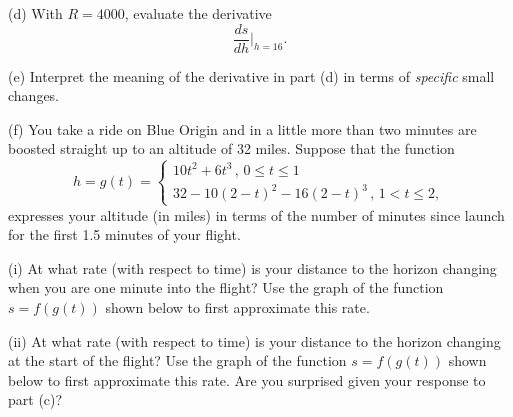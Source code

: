 \documentclass{ximera}
\begin{document}
\begin{question}
(d) With $R=4000$, evaluate the derivative 
\[
      \frac{ds}{dh}\Big|_{h=16} .
\]

(e) Interpret the meaning of the derivative in part (d) in terms of \emph{specific} small changes.

(f) You take a ride on Blue Origin and in a little more than two minutes are boosted straight up to an altitude of 32 miles. Suppose that the function
\[
      h = g(t) = 
\begin{cases}
10t^2 + 6t^3 \, , \, 0\leq t \leq 1  \\
32 - 10(2-t)^2 - 16(2-t)^3 \, , \, 1<t \leq 2 ,
\end{cases}
\]
expresses your altitude (in miles) in terms of the number of minutes since launch for the first 1.5 minutes of your flight.

(i) At what rate (with respect to time) is your distance to the horizon changing when you are one minute into the flight? Use the graph of the function $s=f(g(t))$ shown below to first approximate this rate.

(ii)  At what rate (with respect to time) is your distance to the horizon changing at the start of the flight? Use the graph of the function $s=f(g(t))$ shown below to first approximate this rate. Are you surprised given your response to part (c)?

\begin{onlineOnly}
    \begin{center}
\end{center}
\end{onlineOnly}


\end{question}
\end{document}
